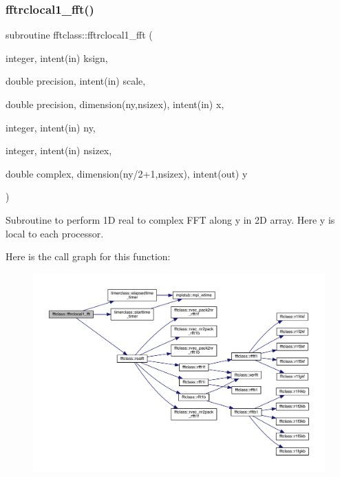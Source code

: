 \subsubsection{\texorpdfstring{fftrclocal1\_fft()}{fftrclocal1\_fft()}}
{\footnotesize\ttfamily subroutine fftclass\+::fftrclocal1\+\_\+fft (\begin{DoxyParamCaption}\item[{integer, intent(in)}]{ksign,  }\item[{double precision, intent(in)}]{scale,  }\item[{double precision, dimension(ny,nsizex), intent(in)}]{x,  }\item[{integer, intent(in)}]{ny,  }\item[{integer, intent(in)}]{nsizex,  }\item[{double complex, dimension(ny/2+1,nsizex), intent(out)}]{y }\end{DoxyParamCaption})}



Subroutine to perform 1D real to complex F\+FT along y in 2D array. Here y is local to each processor. 

Here is the call graph for this function\+:\nopagebreak
\begin{figure}[H]
\begin{center}
\leavevmode
\includegraphics[width=350pt]{namespacefftclass_af33a24fc1bf4d5763c335c0cef247e3c_cgraph}
\end{center}
\end{figure}
\mbox{\label{namespacefftclass_a83a1c8ccf853ae07fdfc5a80e1e244d1}} 
